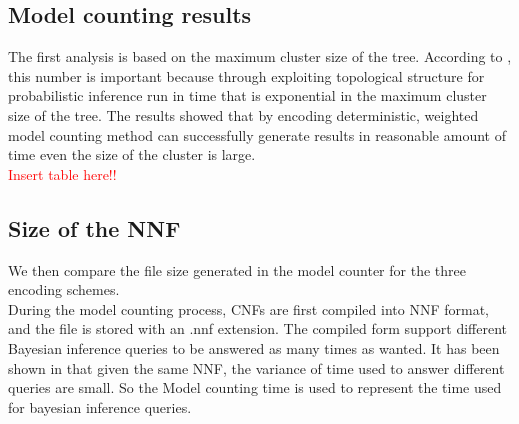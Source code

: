 \subsection{Model counting results}
The first analysis is based on the maximum cluster size of the tree. According to \cite{2008-literature-review}, this number is important because through exploiting topological structure for probabilistic inference run in time that is exponential in the maximum cluster size of the tree. The results showed that by encoding deterministic, weighted model counting method can successfully generate results in reasonable amount of time even the size of the cluster is large. \\
\textcolor{red}{Insert table here!!}\\

\subsection{Size of the NNF}
We then compare the file size generated in the model counter for the three encoding schemes. \\

During the model counting process, CNFs are first compiled into NNF format, and the file is stored with an .nnf extension. The compiled form support different Bayesian inference queries to be answered as many times as wanted. It has been shown in \cite{2008-literature-review} that given the same NNF, the variance of time used to answer different queries are small. So the Model counting time is used to represent the time used for bayesian inference queries.\\

